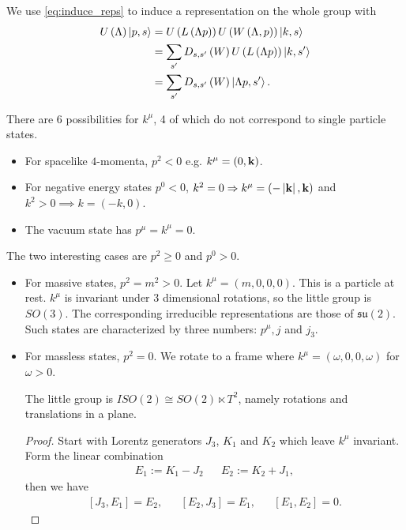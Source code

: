 We use \cref{eq:induce_reps} to induce a representation on the whole group with
\begin{align}
    U \left( \Lambda \right) \ket{p,s} &= U \left( L \left( \Lambda p \right)\right) U \left( W \left( \Lambda, p \right)  \right)  \ket{k,s} \\
    &= \sum_{s'} D_{s,s'} \left( W \right) U \left( L \left( \Lambda p \right)  \right) \ket{k, s'}   \\
    &= \sum_{s'} D_{s,s'} \left( W \right) \ket{\Lambda p ,s'} 
.\end{align}

There are $6$ possibilities for $k^{\mu}$, 4 of which do not correspond to single particle states.

\begin{itemize}
    \item For spacelike $4$-momenta, $p^2 < 0$ e.g. $k^{\mu} = \left( 0, \vb{k} \right) $.
    \item For negative energy states $p^{0} < 0$, $k^2 = 0 \Rightarrow k^{\mu} = \left( -\left| \vb{k} \right| , \vb{k} \right)$ and $k^2 > 0 \implies k = \left( -k,0 \right) $.
    \item The vacuum state has $p^{\mu} = k^{\mu} = 0$.
\end{itemize}

The two interesting cases are $p^2 \geq 0$ and $p^{0} > 0$.

\begin{itemize}
    \item For massive states, $p^2 = m^2 > 0$. Let $k^{\mu} = \left( m , 0, 0, 0 \right) $. This is a particle at rest. $k^{\mu}$ is invariant under 3 dimensional rotations, so the little group is $SO \left( 3 \right) $. The corresponding irreducible representations are those of $\mathfrak{su}\left( 2 \right) $. Such states are characterized by three numbers: $p^{\mu}, j$ and $j_3$.
    \item For massless states, $p^2 = 0$. We rotate to a frame where $k^{\mu} = \left( \omega, 0, 0, \omega \right) $ for $\omega > 0$. 
        \begin{claim}
            The little group is $ISO \left( 2 \right) \cong SO \left( 2 \right) \ltimes T^2$, namely rotations and translations in a plane.
        \end{claim}
        \begin{proof}
            Start with Lorentz generators $J_3$, $K_1$ and $K_2$ which leave $k^{\mu}$ invariant. Form the linear combination
            \begin{align}
                E_1 := K_1 - J_2 &&
                E_2 := K_2 + J_1
            ,\end{align}
            then we have
            \begin{align}
                \left[ J_3, E_1 \right] = E_2,&& \left[ E_2, J_3 \right] = E_1, && \left[ E_1, E_2 \right] = 0
            .\end{align}
        \end{proof}
\end{itemize}

